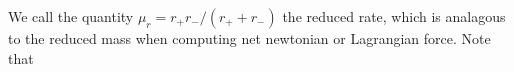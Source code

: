 We call the quantity \(\mu_r = r_+r_-/(r_+ + r_-)\) the reduced rate, which is analagous to the reduced mass when computing net newtonian or Lagrangian force.  Note that